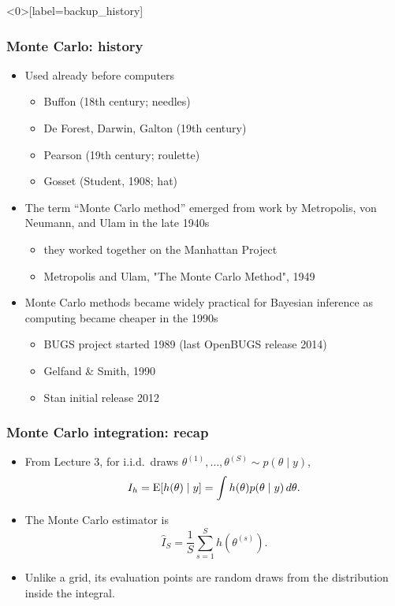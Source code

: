 \documentclass[10pt]{beamer}
\begin{document}
\begin{frame}<0>[label=backup_history]
\frametitle{Monte Carlo: history}

  \begin{itemize}
  \item Used already before computers
    \begin{itemize}
      \item Buffon (18th century; needles)
      \item De Forest, Darwin, Galton (19th century)
      \item Pearson (19th century; roulette)
      \item Gosset (Student, 1908; hat)
    \end{itemize}
    \pause
  \item The term ``Monte Carlo method'' emerged from work by Metropolis,
    von Neumann, and Ulam in the late 1940s
     \begin{itemize}
     \item they worked together on the Manhattan Project
     \item Metropolis and Ulam, "The Monte Carlo Method", 1949
     \end{itemize}
    \pause
   \item Monte Carlo methods became widely practical for Bayesian inference
     as computing became cheaper in the 1990s
     \begin{itemize}
     \item BUGS project started 1989 (last OpenBUGS release 2014)
     \item Gelfand \& Smith, 1990
     \item Stan initial release 2012
     \end{itemize}
  \end{itemize}

\end{frame}

\begin{frame}
\frametitle{Monte Carlo integration: recap}

  \begin{itemize}
    \item From Lecture 3, for i.i.d.\ draws
      $\theta^{(1)},\ldots,\theta^{(S)}\sim p(\theta\mid y)$,
      \[
        I_h=\mathrm{E}[h(\theta)\mid y]
        =\int h(\theta)p(\theta\mid y)\,d\theta.
      \]
    \pause
    \item The Monte Carlo estimator is
      \[
        \hat I_S=\frac{1}{S}\sum_{s=1}^S h(\theta^{(s)}).
      \]
    \item<3-> Unlike a grid, its evaluation points are random draws from
      the distribution inside the integral.
  \end{itemize}

\end{frame}
\end{document}
